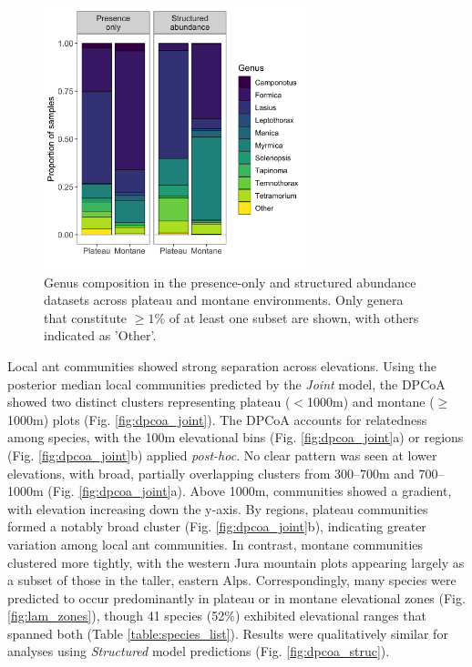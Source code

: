 \documentclass[preprint,review,times,12pt,3p]{elsarticle}
\begin{document}
\begin{figure}
	\centering\includegraphics[width=3in]{../../../ms/1_Ecography/1/figs/genus_assemblages.png}
	\caption{\label{fig:genus_assemblages} Genus composition in the presence-only and structured abundance datasets across plateau and montane environments. Only genera that constitute $\geq 1\%$ of at least one subset are shown, with others indicated as 'Other'.}
\end{figure}

Local ant communities showed strong separation across elevations. Using the posterior median local communities predicted by the \emph{Joint} model, the DPCoA showed two distinct clusters representing plateau ($<$1000m) and montane ($\geq$1000m) plots (Fig. \ref{fig:dpcoa_joint}). The DPCoA accounts for relatedness among species, with the 100m elevational bins (Fig. \ref{fig:dpcoa_joint}a) or regions (Fig. \ref{fig:dpcoa_joint}b) applied \emph{post-hoc}. No clear pattern was seen at lower elevations, with broad, partially overlapping clusters from 300–700m and 700–1000m (Fig. \ref{fig:dpcoa_joint}a). Above 1000m, communities showed a gradient, with elevation increasing down the y-axis. By regions, plateau communities formed a notably broad cluster (Fig. \ref{fig:dpcoa_joint}b), indicating greater variation among local ant communities. In contrast, montane communities clustered more tightly, with the western Jura mountain plots appearing largely as a subset of those in the taller, eastern Alps. Correspondingly, many species were predicted to occur predominantly in plateau or in montane elevational zones (Fig. \ref{fig:lam_zones}), though 41 species (52\%) exhibited elevational ranges that spanned both (Table \ref{table:species_list}). Results were qualitatively similar for analyses using \emph{Structured} model predictions (Fig. \ref{fig:dpcoa_struc}).
\end{document}
